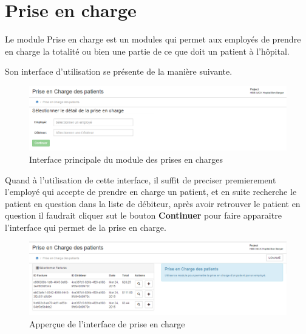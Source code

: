\documentclass[12pt,a4paper]{report}
\begin{document}
\newpage
\section{ Prise en charge}
Le module  Prise en charge est un modules qui permet aux employés de prendre en charge la totalité ou bien une partie de ce que doit un patient à l'hôpital. 

Son interface d'utilisation se présente de la manière suivante.

\begin{figure}[h]
\begin{center}
\includegraphics[width=14cm]{pic/InterPrinPrisCharge.png}
\end{center}
\caption{Interface principale du module des prises en charges}
\label{Interface principale du module des prises en charges}
\end{figure}

Quand à l'utilisation de cette interface, il suffit de preciser premierement l'employé qui accepte de prendre en charge un patient, et en suite recherche le patient en question dans la liste de débiteur, après avoir retrouver le patient en question il faudrait cliquer sut le bouton  \textbf{Continuer} pour faire apparaitre l'interface qui permet de la prise en charge.

\begin{figure}[h]
\begin{center}
\includegraphics[width=14cm]{pic/PriChPatientFact.png}
\end{center}
\caption{Apperçue de l'interface de prise en charge}
\label{Apperçue de l'interface de prise en charge}
\end{figure}
\end{document}
